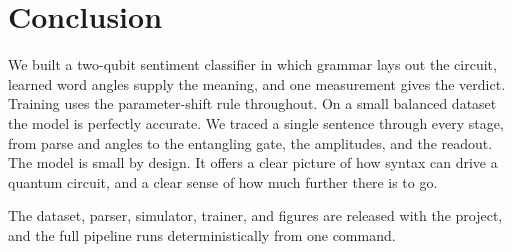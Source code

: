 \documentclass{article}
\begin{document}
\section{Conclusion}
\label{sec:conclusion}

We built a two-qubit sentiment classifier in which grammar lays out the circuit,
learned word angles supply the meaning, and one measurement gives the verdict.
Training uses the parameter-shift rule throughout. On a small balanced dataset
the model is perfectly accurate. We traced a single sentence through every stage,
from parse and angles to the entangling gate, the amplitudes, and the readout.
The model is small by design. It offers a clear picture of how syntax can drive a
quantum circuit, and a clear sense of how much further there is to go.

The dataset, parser, simulator, trainer, and figures are released with the
project, and the full pipeline runs deterministically from one command.



\end{document}
